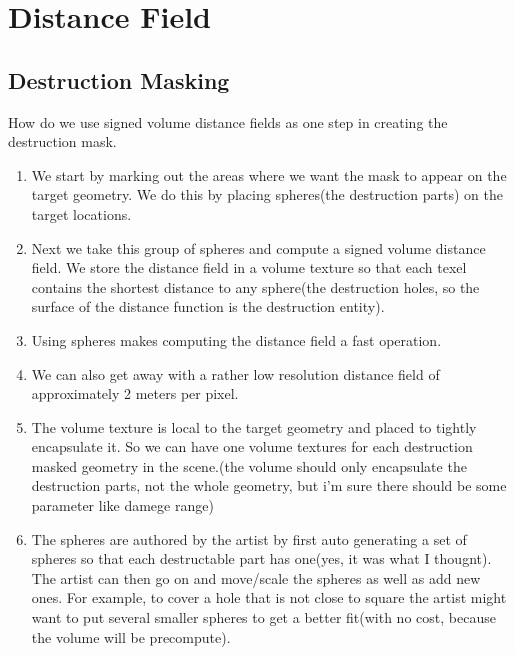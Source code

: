 \chapter{Distance Field}




\section{Destruction Masking}

How do we use signed volume distance fields as one step in creating the destruction mask.

\begin{enumerate}
	\item We start by marking out the areas where we want the mask to appear on the target geometry. We do this by placing spheres(the destruction parts) on the target locations.
	\item Next we take this group of spheres and compute a signed volume distance field. We store the distance field in a volume texture so that each texel contains the shortest distance to any sphere(the destruction holes, so the surface of the distance function is the destruction entity).
	\item Using spheres makes computing the distance field a fast operation.
	\item We can also get away with a rather low resolution distance field of approximately 2 meters per pixel.
	\item The volume texture is local to the target geometry and placed to tightly encapsulate it. So we can have one volume textures for each destruction masked geometry in the scene.(the volume should only encapsulate the destruction parts, not the whole geometry, but i'm sure there should be some parameter like damege range)
	\item The spheres are authored by the artist by first auto generating a set of spheres so that each destructable part has one(yes, it was what I thougnt). The artist can then go on and move/scale the spheres as well as add new ones. For example, to cover a hole that is not close to square the artist might want to put several smaller spheres to get a better fit(with no cost, because the volume will be precompute).  
\end{enumerate}


